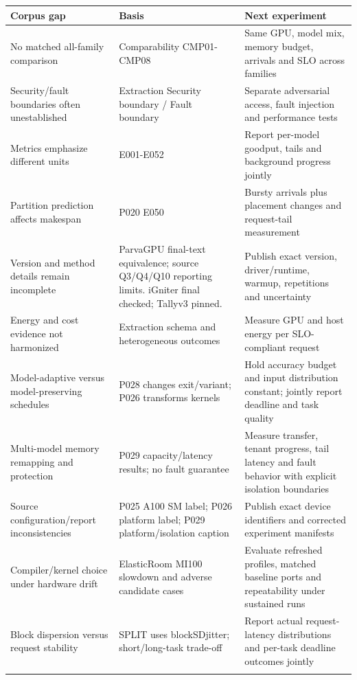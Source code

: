 \begin{longtable}{>{\raggedright\arraybackslash}p{}>{\raggedright\arraybackslash}p{}>{\raggedright\arraybackslash}p{}}
\toprule
\textbf{Corpus gap} & \textbf{Basis} & \textbf{Next experiment}\\\midrule\endhead
No matched all-family comparison & Comparability CMP01-CMP08 & Same GPU, model mix, memory budget, arrivals and SLO across families\\\addlinespace
Security/fault boundaries often unestablished & Extraction Security boundary / Fault boundary & Separate adversarial access, fault injection and performance tests\\\addlinespace
Metrics emphasize different units & E001-E052 & Report per-model goodput, tails and background progress jointly\\\addlinespace
Partition prediction affects makespan & P020 E050 & Bursty arrivals plus placement changes and request-tail measurement\\\addlinespace
Version and method details remain incomplete & ParvaGPU final-text equivalence; source Q3/Q4/Q10 reporting limits. iGniter final checked; Tallyv3 pinned. & Publish exact version, driver/runtime, warmup, repetitions and uncertainty\\\addlinespace
Energy and cost evidence not harmonized & Extraction schema and heterogeneous outcomes & Measure GPU and host energy per SLO-compliant request\\\addlinespace
Model-adaptive versus model-preserving schedules & P028 changes exit/variant; P026 transforms kernels & Hold accuracy budget and input distribution constant; jointly report deadline and task quality\\\addlinespace
Multi-model memory remapping and protection & P029 capacity/latency results; no fault guarantee & Measure transfer, tenant progress, tail latency and fault behavior with explicit isolation boundaries\\\addlinespace
Source configuration/report inconsistencies & P025 A100 SM label; P026 platform label; P029 platform/isolation caption & Publish exact device identifiers and corrected experiment manifests\\\addlinespace
Compiler/kernel choice under hardware drift & ElasticRoom MI100 slowdown and adverse candidate cases & Evaluate refreshed profiles, matched baseline ports and repeatability under sustained runs\\\addlinespace
Block dispersion versus request stability & SPLIT uses blockSDjitter; short/long-task trade-off & Report actual request-latency distributions and per-task deadline outcomes jointly\\\addlinespace
\bottomrule\end{longtable}